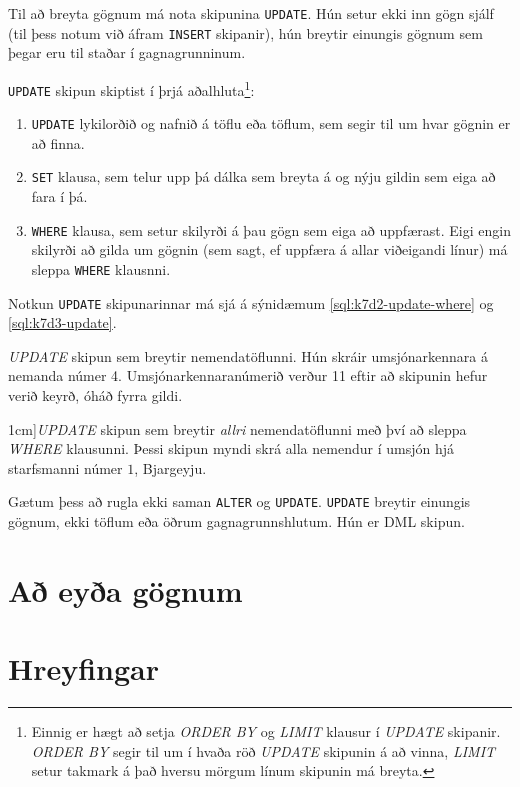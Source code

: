 Til að breyta gögnum má nota skipunina \verb|UPDATE|. Hún setur ekki inn gögn sjálf (til þess notum við áfram \verb|INSERT| skipanir), hún breytir einungis gögnum sem þegar eru til staðar í gagnagrunninum.

\verb|UPDATE| skipun skiptist í þrjá aðalhluta\footnote{Einnig er hægt að setja \emph{ORDER BY} og \emph{LIMIT} klausur í \emph{UPDATE} skipanir. \emph{ORDER BY} segir til um í hvaða röð \emph{UPDATE} skipunin á að vinna, \emph{LIMIT} setur takmark á það hversu mörgum línum skipunin má breyta.}:
\begin{enumerate}
 \item \verb|UPDATE| lykilorðið og nafnið á töflu eða töflum, sem segir til um hvar gögnin er að finna.
 \item \verb|SET| klausa, sem telur upp þá dálka sem breyta á og nýju gildin sem eiga að fara í þá.
 \item \verb|WHERE| klausa, sem setur skilyrði á þau gögn sem eiga að uppfærast. Eigi engin skilyrði að gilda um gögnin (sem sagt, ef uppfæra á allar viðeigandi línur) má sleppa \verb|WHERE| klausnni. 
\end{enumerate}
Notkun \verb|UPDATE| skipunarinnar má sjá á sýnidæmum \ref{sql:k7d2-update-where} og \ref{sql:k7d3-update}.

\begin{example}
\caption[UPDATE með WHERE]{\emph{UPDATE} skipun sem breytir nemendatöflunni. Hún skráir umsjónarkennara á nemanda númer 4. Umsjónarkennaranúmerið verður 11 eftir að skipunin hefur verið keyrð, óháð fyrra gildi.}
\label{sql:k7d2-update-where}
\centering
{}
\end{example}

\begin{example}
\caption[UPDATE án WHERE][1cm]{\emph{UPDATE} skipun sem breytir \emph{allri} nemendatöflunni með því að sleppa \emph{WHERE} klausunni. Þessi skipun myndi skrá alla nemendur í umsjón hjá starfsmanni númer $1$, Bjargeyju.}
\vspace{1cm}
\label{sql:k7d3-update}
\centering
{}
\end{example}

Gætum þess að rugla ekki saman \verb|ALTER| og \verb|UPDATE|. \verb|UPDATE| breytir einungis gögnum, ekki töflum eða öðrum gagnagrunnshlutum. Hún er DML skipun.
\section{Að eyða gögnum}
\section{Hreyfingar} %